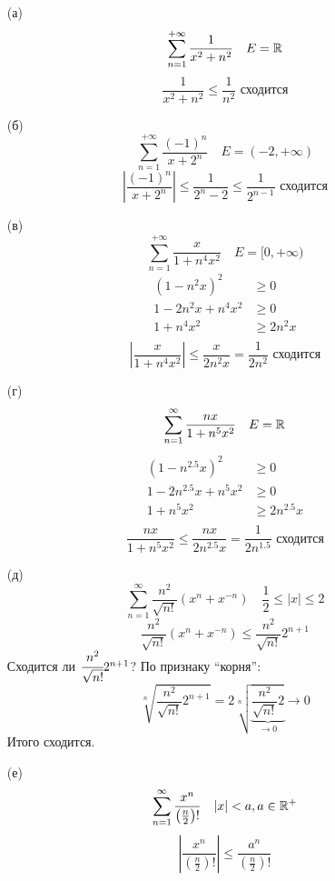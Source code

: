 \begin{exercise}[2774]\itemfix
    \begin{enumerate}
        \item [(а)] \[\sum_{n = 1}^{ +\infty} \frac{1}{x^2 + n^2} \quad E = \mathbb{R}\]
              \[\frac{1}{x^2 + n^2} \leq \frac{1}{n^2} \text{ сходится}\]
        \item [(б)] \[\sum_{n = 1}^{ +\infty} \frac{( - 1)^n}{x + 2^n} \quad E = ( - 2, +\infty)\]
              \[\left|\frac{( - 1)^n}{x + 2^n}\right| \leq \frac{1}{2^n - 2} \leq \frac{1}{2^{n - 1}} \text{ сходится}\]
        \item [(в)] \[\sum_{n = 1}^{ +\infty} \frac{x}{1 + n^4x^2} \quad E = [0, +\infty)\]
              \begin{align*}
                  (1 - n^2x)^2       & \geq 0     \\
                  1 - 2n^2x + n^4x^2 & \geq 0     \\
                  1 + n^4x^2         & \geq 2n^2x \\
              \end{align*}
              \[\left|\frac{x}{1 + n^4x^2}\right| \leq \frac{x}{2n^2x} = \frac{1}{2n^2} \text{ сходится}\]
        \item [(г)] \[\sum_{n = 1}^{\infty} \frac{nx}{1 + n^5x^2} \quad E = \mathbb{R}\]
              \begin{align*}
                  (1 - n^{2.5}x)^2       & \geq 0         \\
                  1 - 2n^{2.5}x + n^5x^2 & \geq 0         \\
                  1 + n^5x^2             & \geq 2n^{2.5}x \\
              \end{align*}
              \[\frac{nx}{1 + n^5x^2} \leq \frac{nx}{2n^{2.5}x} = \frac{1}{2n^{1.5}} \text{ сходится}\]
        \item [(д)] \[\sum_{n = 1}^{\infty} \frac{n^2}{\sqrt{n!}}(x^n + x^{ - n}) \quad \frac{1}{2} \leq |x| \leq 2\]
              \[\frac{n^2}{\sqrt{n!}}(x^n + x^{ - n}) \leq \frac{n^2}{\sqrt{n!}} 2^{n + 1}\]
              Сходится ли \(\cfrac{n^2}{\sqrt{n!}} 2^{n + 1}\)? По признаку ``корня'':
              \[\sqrt[n]{\frac{n^2}{\sqrt{n!}} 2^{n + 1}} = 2 \sqrt[n]{\underbrace{\frac{n^2}{\sqrt{n!}} 2}_{\to 0}} \to 0\]
              Итого сходится.
        \item [(е)] \[\sum_{n = 1}^{\infty} \frac{x^n}{\left( \frac{n}{2} \right)!} \quad |x| < a, a\in \mathbb{R}^{ +}\]
              \[\left|\frac{x^n}{\left( \frac{n}{2} \right)!}\right| \leq \frac{a^n}{\left( \frac{n}{2} \right)!}\]

\end{enumerate}
\end{exercise}
